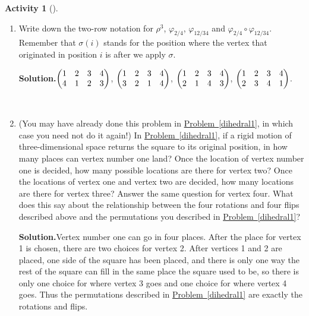 \documentclass[10pt,]{book}
\theoremstyle{plain}
\theoremstyle{definition}
\newtheorem{activity}[project]{Activity}
\numberwithin{equation}{chapter}
\newcommand{\amp}{&}
\begin{document}
\begin{activity}[]\label{dihedral2}
~\par
\begin{enumerate}[label=(\alph*)]
 \item Write down the two-row notation for \(\rho^3\), \(\varphi_{2/4}\), \(\varphi_{12/34}\) and \(\varphi_{2/4}\circ \varphi_{12/34}\). Remember that \(\sigma(i)\) stands for the position where the vertex that originated in position \(i\) is after we apply \(\sigma\).%
\par\medskip\noindent%
\textbf{Solution.}\quad \(\begin{pmatrix}1\amp 2\amp 3\amp 4\cr4\amp 1\amp 2\amp 3
\end{pmatrix}\), \(\begin{pmatrix}1\amp 2\amp 3\amp 4\cr3\amp 2\amp 1\amp 4
\end{pmatrix}\), \(\begin{pmatrix}1\amp 2\amp 3\amp 4\cr2\amp 1\amp 4\amp 3
\end{pmatrix}\), \(\begin{pmatrix}1\amp 2\amp 3\amp 4\cr2\amp 3\amp 4\amp 1
\end{pmatrix}\).%

~\par
\item (You may have already done this problem in \hyperref[dihedral1]{Problem~\ref{dihedral1}}, in which case you need not do it again!) In \hyperref[dihedral1]{Problem~\ref{dihedral1}}, if a rigid motion of three-dimensional space returns the square to its original position, in how many places can vertex number one land? Once the location of vertex number one is decided, how many possible locations are there for vertex two? Once the locations of vertex one and vertex two are decided, how many locations are there for vertex three? Answer the same question for vertex four. What does this say about the relationship between the four rotations and four flips described above and the permutations you described in \hyperref[dihedral1]{Problem~\ref{dihedral1}}?%
\par\medskip\noindent%
\textbf{Solution.}\quad Vertex number one can go in four places. After the place for vertex 1 is chosen, there are two choices for vertex 2. After vertices 1 and 2 are placed, one side of the square has been placed, and there is only one way the rest of the square can fill in the same place the square used to be, so there is only one choice for where vertex 3 goes and one choice for where vertex 4 goes. Thus the permutations described in \hyperref[dihedral1]{Problem~\ref{dihedral1}} are exactly the rotations and flips.%

\end{enumerate}
\end{activity}
\end{document}
